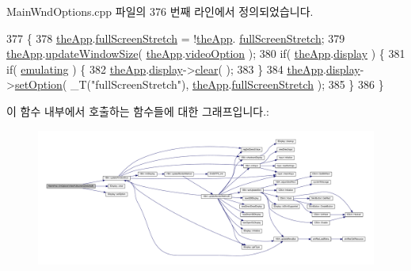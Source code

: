 Main\+Wnd\+Options.\+cpp 파일의 376 번째 라인에서 정의되었습니다.


\begin{DoxyCode}
377 \{
378     \mbox{\hyperlink{_v_b_a_8cpp_a8095a9d06b37a7efe3723f3218ad8fb3}{theApp}}.\mbox{\hyperlink{class_v_b_a_a00bd5b85110bd763ad39eb4a9fb403a1}{fullScreenStretch}} = !\mbox{\hyperlink{_v_b_a_8cpp_a8095a9d06b37a7efe3723f3218ad8fb3}{theApp}}.
      \mbox{\hyperlink{class_v_b_a_a00bd5b85110bd763ad39eb4a9fb403a1}{fullScreenStretch}};
379     \mbox{\hyperlink{_v_b_a_8cpp_a8095a9d06b37a7efe3723f3218ad8fb3}{theApp}}.\mbox{\hyperlink{class_v_b_a_ac278ece4958310ce2ef8751afbad08f3}{updateWindowSize}}( \mbox{\hyperlink{_v_b_a_8cpp_a8095a9d06b37a7efe3723f3218ad8fb3}{theApp}}.\mbox{\hyperlink{class_v_b_a_a17dac073149c897f770c00ed7098ad32}{videoOption}} );
380     \textcolor{keywordflow}{if}( \mbox{\hyperlink{_v_b_a_8cpp_a8095a9d06b37a7efe3723f3218ad8fb3}{theApp}}.\mbox{\hyperlink{class_v_b_a_a940e5bad8b3ed2436888dbcd03bfd563}{display}} ) \{
381         \textcolor{keywordflow}{if}( \mbox{\hyperlink{_main_wnd_options_8cpp_af9cc36078b1b311753963297ae7f2a74}{emulating}} ) \{
382             \mbox{\hyperlink{_v_b_a_8cpp_a8095a9d06b37a7efe3723f3218ad8fb3}{theApp}}.\mbox{\hyperlink{class_v_b_a_a940e5bad8b3ed2436888dbcd03bfd563}{display}}->\mbox{\hyperlink{class_i_display_affb8a8b5651d138058cdbd088ff3968d}{clear}}( );
383         \}
384         \mbox{\hyperlink{_v_b_a_8cpp_a8095a9d06b37a7efe3723f3218ad8fb3}{theApp}}.\mbox{\hyperlink{class_v_b_a_a940e5bad8b3ed2436888dbcd03bfd563}{display}}->\mbox{\hyperlink{class_i_display_a1766244708c252bb8781892c76c20ba9}{setOption}}( \_T(\textcolor{stringliteral}{"fullScreenStretch"}), 
      \mbox{\hyperlink{_v_b_a_8cpp_a8095a9d06b37a7efe3723f3218ad8fb3}{theApp}}.\mbox{\hyperlink{class_v_b_a_a00bd5b85110bd763ad39eb4a9fb403a1}{fullScreenStretch}} );
385     \}
386 \}
\end{DoxyCode}
이 함수 내부에서 호출하는 함수들에 대한 그래프입니다.\+:
\nopagebreak
\begin{figure}[H]
\begin{center}
\leavevmode
\includegraphics[width=350pt]{class_main_wnd_a261e810d4a9386c968d30a3449389f54_cgraph}
\end{center}
\end{figure}
\mbox{\label{class_main_wnd_aa90dfd9dfe90390a030a60e484af0958}} 

